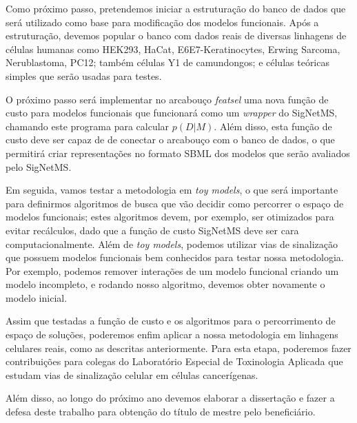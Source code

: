 \documentclass[12pt]{article}
\newcommand{\foreignword}[1]{\textit{#1}}
\begin{document}
Como próximo passo, pretendemos iniciar a estruturação do banco de dados 
que será utilizado como base para modificação dos modelos funcionais. 
Após a estruturação, devemos popular o banco com dados reais de diversas 
linhagens de células humanas como HEK293, HaCat, E6E7-Keratinocytes,
Erwing Sarcoma, Nerublastoma, PC12; também células Y1 de camundongos; e
células teóricas simples que serão usadas para testes.

O próximo passo será implementar no arcabouço {\em featsel} uma nova
função de custo para modelos funcionais que funcionará como um 
\foreignword{wrapper} do SigNetMS, chamando este programa para calcular 
$p (D | M)$. Além disso, esta função de custo deve ser capaz de de
conectar o arcabouço com o banco de dados, o que permitirá criar 
representações no formato SBML dos modelos que serão avaliados pelo 
SigNetMS. 

Em seguida, vamos testar a metodologia em 
\foreignword{toy models}, o que será importante para definirmos 
algoritmos de busca que vão decidir como percorrer o espaço de modelos
funcionais; estes algoritmos devem, por exemplo, ser otimizados para 
evitar recálculos, dado que a função de custo SigNetMS deve ser cara
computacionalmente. Além de \foreignword{toy models}, podemos utilizar 
vias de sinalização que possuem modelos funcionais bem conhecidos para 
testar nossa metodologia. Por exemplo, podemos remover interações de um 
modelo funcional criando um modelo incompleto, e rodando nosso 
algoritmo, devemos obter novamente o modelo inicial.

Assim que testadas a função de custo e os algoritmos para o 
percorrimento de espaço de soluções, poderemos enfim aplicar a nossa 
metodologia em linhagens celulares reais, como as descritas 
anteriormente. Para esta etapa, poderemos fazer contribuições para 
colegas do Laboratório Especial de Toxinologia Aplicada que estudam
vias de sinalização celular em células cancerígenas.

Além disso, ao longo do próximo ano devemos elaborar a dissertação e 
fazer a defesa deste trabalho para obtenção do título de mestre pelo
beneficiário.
\end{document}
